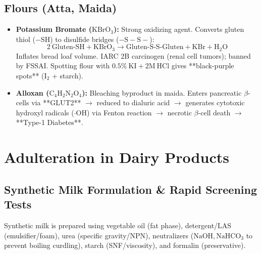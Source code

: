 \documentclass[10pt,a4paper,oneside]{article}
\begin{document}
\subsection{Flours (Atta, Maida)}
\begin{itemize}[leftmargin=*]
    \item \textbf{Potassium Bromate ($\mathrm{KBrO_3}$):} Strong oxidizing agent. Converts gluten thiol ($-\mathrm{SH}$) to disulfide bridges ($-\mathrm{S-S-}$):
    $$2\ \text{Gluten-SH} + \mathrm{KBrO_3 \longrightarrow \text{Gluten-S-S-Gluten} + KBr + H_2O}$$
    Inflates bread loaf volume. IARC 2B carcinogen (renal cell tumors); banned by FSSAI. Spotting flour with $0.5\%\ \mathrm{KI} + 2\mathrm{M}\ \mathrm{HCl}$ gives **black-purple spots** ($\mathrm{I_2}$ + starch).
    \item \textbf{Alloxan ($\mathrm{C_4H_2N_2O_4}$):} Bleaching byproduct in maida. Enters pancreatic $\beta$-cells via **GLUT2** $\rightarrow$ reduced to dialuric acid $\rightarrow$ generates cytotoxic hydroxyl radicals ($\mathrm{\cdot OH}$) via Fenton reaction $\rightarrow$ necrotic $\beta$-cell death $\rightarrow$ **Type-1 Diabetes**.
\end{itemize}

\newpage

\section{Adulteration in Dairy Products}

\subsection{Synthetic Milk Formulation \& Rapid Screening Tests}
Synthetic milk is prepared using vegetable oil (fat phase), detergent/LAS (emulsifier/foam), urea (specific gravity/NPN), neutralizers ($\mathrm{NaOH, NaHCO_3}$ to prevent boiling curdling), starch (SNF/viscosity), and formalin (preservative).
\end{document}
